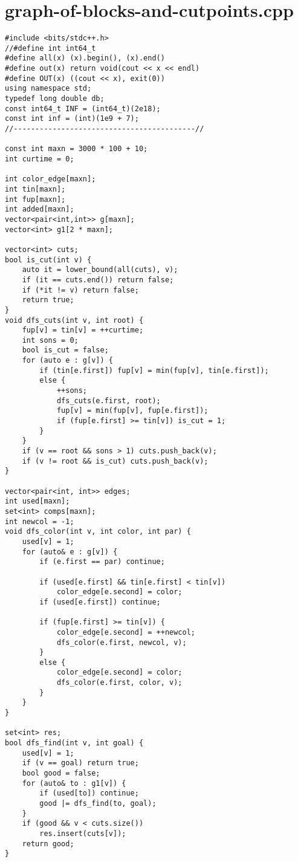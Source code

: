 \documentclass[a4paper,12pt]{report}
\begin{document}
\section{graph-of-blocks-and-cutpoints.cpp}
\begin{lstlisting}
#include <bits/stdc++.h>
//#define int int64_t
#define all(x) (x).begin(), (x).end()
#define out(x) return void(cout << x << endl)
#define OUT(x) ((cout << x), exit(0))
using namespace std;
typedef long double db;
const int64_t INF = (int64_t)(2e18);
const int inf = (int)(1e9 + 7);
//------------------------------------------//

const int maxn = 3000 * 100 + 10;
int curtime = 0;

int color_edge[maxn];
int tin[maxn];
int fup[maxn];
int added[maxn];
vector<pair<int,int>> g[maxn];
vector<int> g1[2 * maxn];

vector<int> cuts;
bool is_cut(int v) {
    auto it = lower_bound(all(cuts), v);
    if (it == cuts.end()) return false;
    if (*it != v) return false;
    return true;
}
void dfs_cuts(int v, int root) {
    fup[v] = tin[v] = ++curtime;
    int sons = 0;
    bool is_cut = false;
    for (auto e : g[v]) {
        if (tin[e.first]) fup[v] = min(fup[v], tin[e.first]);
        else {
            ++sons;
            dfs_cuts(e.first, root);
            fup[v] = min(fup[v], fup[e.first]);
            if (fup[e.first] >= tin[v]) is_cut = 1;
        }
    }
    if (v == root && sons > 1) cuts.push_back(v);
    if (v != root && is_cut) cuts.push_back(v);
}

vector<pair<int, int>> edges;
int used[maxn];
set<int> comps[maxn];
int newcol = -1;
void dfs_color(int v, int color, int par) {
    used[v] = 1;
    for (auto& e : g[v]) {
        if (e.first == par) continue;

        if (used[e.first] && tin[e.first] < tin[v])
            color_edge[e.second] = color;
        if (used[e.first]) continue;

        if (fup[e.first] >= tin[v]) {
            color_edge[e.second] = ++newcol;
            dfs_color(e.first, newcol, v);
        }
        else {
            color_edge[e.second] = color;
            dfs_color(e.first, color, v);
        }
    }
}

set<int> res;
bool dfs_find(int v, int goal) {
    used[v] = 1;
    if (v == goal) return true;
    bool good = false;
    for (auto& to : g1[v]) {
        if (used[to]) continue;
        good |= dfs_find(to, goal);
    }
    if (good && v < cuts.size())
        res.insert(cuts[v]);
    return good;
}


\end{lstlisting}
\end{document}
